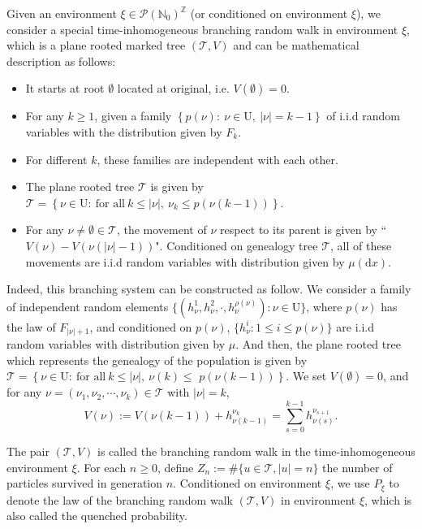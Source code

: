 \documentclass[]{article}
\numberwithin{equation}{section}
\theoremstyle{thmstyleone}%
\theoremstyle{thmstyletwo}%
\theoremstyle{thmstylethree}%
\theoremstyle{thmstylefour}%
\theoremstyle{thmstylefive}%
\theoremstyle{thmstylesix}%
\renewcommand{\d}{\mathrm{d}}
\newcommand{\N}{\mathbb{N}}
\newcommand{\T}{\mathcal{T}}
\begin{document}
	Given an environment $\xi\in \mathcal{P}\left(\N_0\right)^{\mathbb{Z}}$ (or conditioned on environment $\xi$), we consider a special time-inhomogeneous branching random walk in environment $\xi$, which is a plane rooted marked tree $(\mathcal{T},V)$ and can be mathematical description as follows:
	\begin{itemize}
		\item It starts at root $\emptyset$ located at original, i.e. $V(\emptyset) = 0$.
		\item For any $k\geqslant1$, given a family $\left\{p(\nu):~\nu\in\mathrm{U},~|\nu|=k-1\right\}$ of i.i.d random variables with the distribution given by $F_k$.
		\item For different $k$, these families are independent with each other.
		\item The plane rooted tree $\mathcal{T}$ is given by $ \mathcal{T} = \left\{
		\nu\in\mathrm{U}:~\text{for all}~k\leqslant |\nu|, ~\nu_k\leqslant
		p(\nu(k-1)) \right\}.$
		\item For any $\nu\neq\emptyset\in \mathcal{T}$, the movement of $\nu$ respect to its parent is given by ``$V(\nu)-V(\nu(|\nu|-1))$". Conditioned on genealogy tree $\mathcal{T}$, all of these movements are i.i.d random variables with distribution given by $\mu(\d x)$.
	\end{itemize}
	Indeed, this branching system can be constructed as follow.
	We consider a family of independent random elements
	$\{ (h_{\nu}^1,h_{\nu}^2,\cdot,h_{\nu}^{\rho(\nu)}):\nu\in\mathrm{U} \}$, where $p(\nu)$ has the law of $F_{|\nu|+1}$, and conditioned on $p(\nu)$, $\{h_{\nu}^i:1\leqslant i\leqslant p(\nu)\}$ are i.i.d random variables with distribution given by $\mu$. 
	And then, the plane rooted tree which represents the genealogy of the population is given by $ \mathcal{T} = \left\{
	\nu\in\mathrm{U}:~\text{for all}~k\leqslant |\nu|, ~\nu(k)\leqslant\right.$ $\left.
	p(\nu(k-1)) \right\}$. We set $V(\emptyset) = 0$, and for any $\nu=(\nu_1,\nu_2,\cdots,\nu_{k})\in\mathcal{T}$ with $|\nu|=k$, 
	\begin{equation}
		V(\nu) := V(\nu(k-1))+ h_{\nu(k-1)}^{\nu_k} = \sum_{s=0}^{k-1} h_{\nu(s)}^{\nu_{s+1}}.
	\end{equation}
	
	The pair $\left(\T,V\right)$ is called the branching random walk 
	in the time-inhomogeneous environment $\xi$.
	For each $n\geqslant0$, define $Z_n:= \# \{u\in \T,|u|=n\}$ the number of particles survived in generation $n$.
	Conditioned on environment $\xi$, we use $P_\xi$ to denote the law of the branching random walk $\left(\T,V\right)$ in environment $\xi$, which is also called the quenched probability.
	
\end{document}
